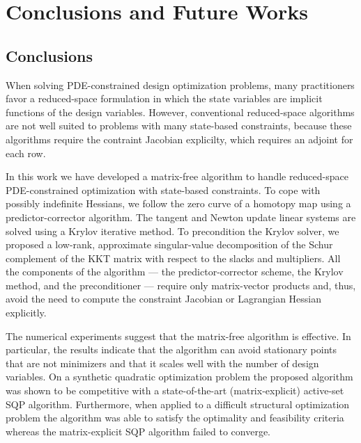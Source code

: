  
\chapter{Conclusions and Future Works}

\section{Conclusions}
When solving PDE-constrained design optimization problems, many practitioners
favor a reduced-space formulation in which the state variables are implicit
functions of the design variables.  However, conventional reduced-space
algorithms are not well suited to problems with many state-based constraints,
because these algorithms require the contraint Jacobian explicilty, which
requires an adjoint for each row.

In this work we have developed a matrix-free algorithm to handle reduced-space
PDE-constrained optimization with state-based constraints.  To cope with
possibly indefinite Hessians, we follow the zero curve of a homotopy map using a
predictor-corrector algorithm.  The tangent and Newton update linear systems are
solved using a Krylov iterative method.  To precondition the Krylov solver, we
proposed a low-rank, approximate singular-value decomposition of the Schur
complement of the KKT matrix with respect to the slacks and multipliers.  All
the components of the algorithm --- the predictor-corrector scheme, the Krylov
method, and the preconditioner --- require only matrix-vector products and,
thus, avoid the need to compute the constraint Jacobian or Lagrangian Hessian
explicitly.

The numerical experiments suggest that the matrix-free algorithm is effective.
In particular, the results indicate that the algorithm can avoid stationary
points that are not minimizers and that it scales well with the number of design
variables.  On a synthetic quadratic optimization problem the proposed algorithm
was shown to be competitive with a state-of-the-art (matrix-explicit) active-set
SQP algorithm.  Furthermore, when applied to a difficult structural optimization
problem the algorithm was able to satisfy the optimality and feasibility
criteria whereas the matrix-explicit SQP algorithm failed to converge. 

